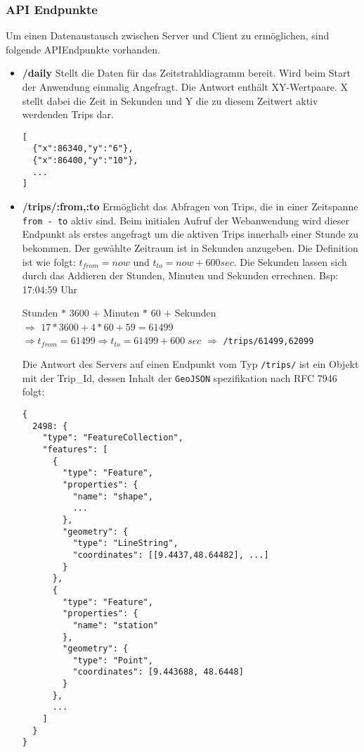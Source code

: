 \subsubsection{API Endpunkte}
\label{ssub:api_endpunkte}
  Um einen Datenaustausch zwischen Server und Client zu ermöglichen, sind folgende API\footnotemark Endpunkte vorhanden. 


  \begin{itemize}[label={}]
    \item \textbf{/daily} Stellt die Daten für das Zeitstrahldiagramm bereit. Wird beim Start der Anwendung einmalig Angefragt. Die Antwort enthält XY-Wertpaare. X stellt dabei die Zeit in Sekunden und Y die zu diesem Zeitwert aktiv werdenden Trips dar.

\begin{lstlisting}[captionpos=t, caption=Antwort des Servers zur Anfrage \texttt{/daily}, label=lst:daily_response]
[
  {"x":86340,"y":"6"},
  {"x":86400,"y":"10"}, 
  ...
]
\end{lstlisting}

    \item \textbf{/trips/:from,:to} Ermöglicht das Abfragen von Trips, die in einer Zeitspanne \texttt{from - to} aktiv sind. Beim initialen Aufruf der Webanwendung wird dieser Endpunkt als erstes angefragt um die aktiven Trips innerhalb einer Stunde zu bekommen. Der gewählte Zeitraum ist in Sekunden anzugeben. Die Definition ist wie folgt: $t_{from} = now$ und $t_{to} = now + 600 sec$. Die Sekunden lassen sich durch das Addieren der Stunden, Minuten und Sekunden errechnen. Bsp: 17:04:59 Uhr

    Stunden $*$ 3600 $+$ Minuten $*$ 60 $+$ Sekunden\\
    $\Rightarrow$ $17 * 3600 + 4 * 60 + 59 = 61499$\\
    $\Rightarrow t_{from} = 61499 \Rightarrow t_{to} = 61499 + 600\;sec$ $\Rightarrow$ \texttt{/trips/61499,62099}

    Die Antwort des Servers auf einen Endpunkt vom Typ \texttt{/trips/} ist ein Objekt mit der Trip\_Id, dessen Inhalt der \texttt{GeoJSON} spezifikation nach RFC 7946 folgt:

\begin{lstlisting}[captionpos=t, caption=Trip Objekt, label=lst:trip_object]
{
  2498: {  
    "type": "FeatureCollection",
    "features": [
      {
        "type": "Feature",
        "properties": {
          "name": "shape",
          ...
        },
        "geometry": {
          "type": "LineString",
          "coordinates": [[9.4437,48.64482], ...]
        }
      },
      {
        "type": "Feature",
        "properties": {
          "name": "station"
        },
        "geometry": {
          "type": "Point",
          "coordinates": [9.443688, 48.6448]
        }
      },
      ...
    ]
  }
}
\end{lstlisting}
  

\end{itemize}
